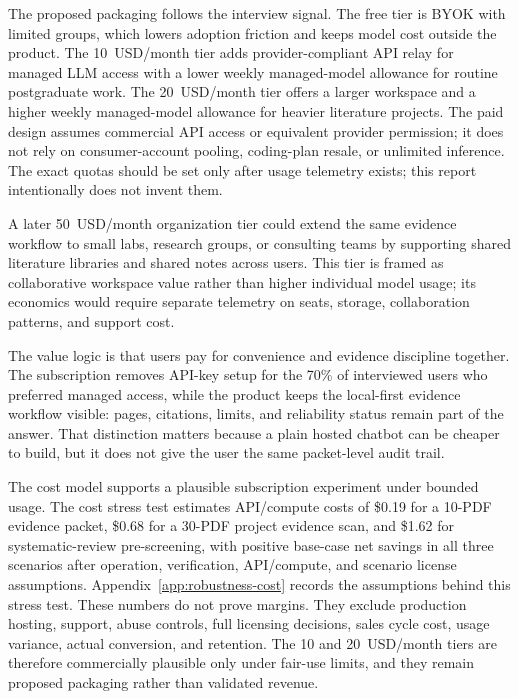 \documentclass{article}
\begin{document}
The proposed packaging follows the interview signal. The free tier is BYOK with limited groups, which lowers adoption friction and keeps model cost outside the product. The 10~USD/month tier adds provider-compliant API relay for managed LLM access with a lower weekly managed-model allowance for routine postgraduate work. The 20~USD/month tier offers a larger workspace and a higher weekly managed-model allowance for heavier literature projects. The paid design assumes commercial API access or equivalent provider permission; it does not rely on consumer-account pooling, coding-plan resale, or unlimited inference. The exact quotas should be set only after usage telemetry exists; this report intentionally does not invent them.

A later 50~USD/month organization tier could extend the same evidence workflow to small labs, research groups, or consulting teams by supporting shared literature libraries and shared notes across users. This tier is framed as collaborative workspace value rather than higher individual model usage; its economics would require separate telemetry on seats, storage, collaboration patterns, and support cost.



The value logic is that users pay for convenience and evidence discipline together. The subscription removes API-key setup for the 70\% of interviewed users who preferred managed access, while the product keeps the local-first evidence workflow visible: pages, citations, limits, and reliability status remain part of the answer. That distinction matters because a plain hosted chatbot can be cheaper to build, but it does not give the user the same packet-level audit trail.

The cost model supports a plausible subscription experiment under bounded usage. The cost stress test estimates API/compute costs of \$0.19 for a 10-PDF evidence packet, \$0.68 for a 30-PDF project evidence scan, and \$1.62 for systematic-review pre-screening, with positive base-case net savings in all three scenarios after operation, verification, API/compute, and scenario license assumptions. Appendix~\ref{app:robustness-cost} records the assumptions behind this stress test. These numbers do not prove margins. They exclude production hosting, support, abuse controls, full licensing decisions, sales cycle cost, usage variance, actual conversion, and retention. The 10 and 20~USD/month tiers are therefore commercially plausible only under fair-use limits, and they remain proposed packaging rather than validated revenue.
\end{document}
